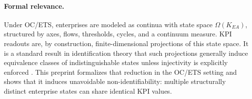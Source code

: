\paragraph{Formal relevance.}
Under OC/ETS, enterprises are modeled as continua with state space
\(\Omega(K_{EA})\), structured by axes, flows, thresholds, cycles, and a
continuum measure.
KPI readouts are, by construction, finite-dimensional projections of this state
space.
It is a standard result in identification theory that such projections generally
induce equivalence classes of indistinguishable states unless injectivity is
explicitly enforced \cite{ljung1999,walter1982}.
This preprint formalizes that reduction in the OC/ETS setting and shows that it
induces unavoidable non-identifiability: multiple structurally distinct
enterprise states can share identical KPI values.
